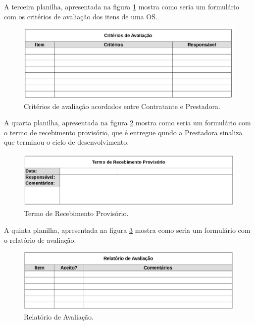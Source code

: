 A terceira planilha, apresentada na figura \ref{fig:prot_eval} mostra como
seria um formulário com os critérios de avaliação dos itens de uma OS.

\begin{figure}[H]
  \includegraphics[width=1.0\textwidth,natwidth=500,natheight=150]{figures/prot_eval.png}
  \caption{Critérios de avaliação acordados entre Contratante e Prestadora.}
  \label{fig:prot_eval}
\end{figure}

A quarta planilha, apresentada na figura \ref{fig:prot_ack_temp} mostra como
seria um formulário com o termo de recebimento provisório, que é entregue qundo
a Prestadora sinaliza que terminou o ciclo de desenvolvimento.

\begin{figure}[H]
  \includegraphics[width=1.0\textwidth,natwidth=500,natheight=150]{figures/prot_ack_temp.png}
  \caption{Termo de Recebimento Provisório.}
  \label{fig:prot_ack_temp}
\end{figure}

A quinta planilha, apresentada na figura \ref{fig:prot_eval_report} mostra como
seria um formulário com o relatório de avaliação.

\begin{figure}[H]
  \includegraphics[width=1.0\textwidth,natwidth=500,natheight=150]{figures/prot_eval_report.png}
  \caption{Relatório de Avaliação.}
  \label{fig:prot_eval_report}
\end{figure}


